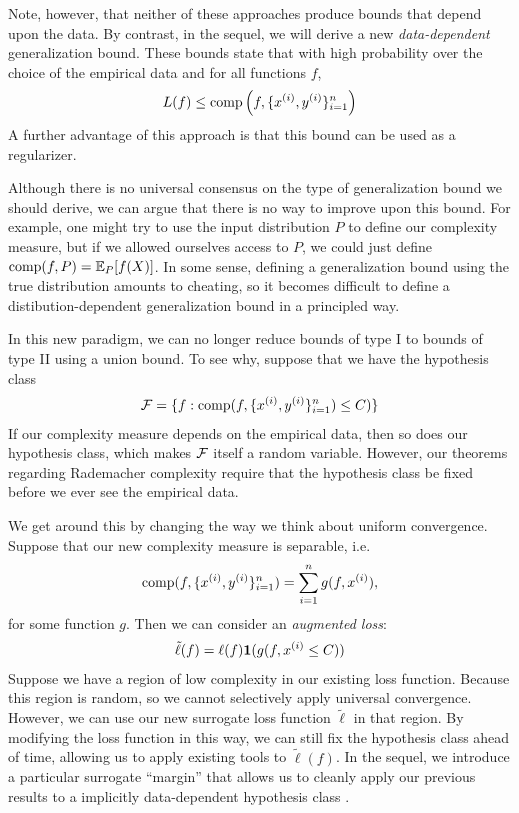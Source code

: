 Note, however, that neither of these approaches produce bounds that depend upon the data. By contrast, in the sequel, we will derive a new \textit{data-dependent} generalization bound. These bounds state that with high probability over the choice of the empirical data and for all functions $f$, 
\begin{align}
    L(f) \leq \text{comp}\left (f, \{x\sp{i}, y\sp{i}\}_{i = 1}^n\right)
\end{align}
A further advantage of this approach is that this bound can be used as a regularizer.

\begin{remark}
Although there is no universal consensus on the type of generalization bound we should derive, we can argue that there is no way to improve upon this bound. For example, one might try to use the input distribution $P$ to define our complexity measure, but if we allowed ourselves access to $P$, we could just define $\text{comp}(f, P) = \Exp_P[f(X)]$. In some sense, defining a generalization bound using the true distribution amounts to cheating, so it becomes difficult to define a distibution-dependent generalization bound in a principled way.
\end{remark}

In this new paradigm, we can no longer reduce bounds of type I to bounds of type II using a union bound. To see why, suppose that we have the hypothesis class
\begin{align}
    \cF = \{f: \text{comp}(f, \{x\sp{i}, y\sp{i}\}_{i=1}^n) \leq C)\}
\end{align}
If our complexity measure depends on the empirical data, then so does our hypothesis class, which makes $\cF$ itself a random variable. However, our theorems regarding Rademacher complexity require that the hypothesis class be fixed before we ever see the empirical data.

We get around this by changing the way we think about uniform convergence. Suppose that our new complexity measure is separable, i.e.
\begin{align}
    \text{comp}(f, \{x\sp{i}, y\sp{i}\}_{i=1}^n) = \sum_{i=1}^n g(f, x\sp{i}),
\end{align}
for some function $g$. Then we can consider an \textit{augmented loss}:
\begin{align}
    \tilde{\ell}(f) = \ell(f) \mathbf{1}(g(f, x\sp{i} \leq C))
\end{align}
Suppose we have a region of low complexity in our existing loss function. Because this region is random, so we cannot selectively apply universal convergence. However, we can use our new surrogate loss function $\tilde{\ell}$ in that region. By modifying the loss function in this way, we can still fix the hypothesis class ahead of time, allowing us to apply existing tools to $\tilde{\ell}(f)$. In the sequel, we introduce a particular surrogate ``margin'' that allows us to cleanly apply our previous results to a implicitly data-dependent hypothesis class \cite{wei2019data}.

